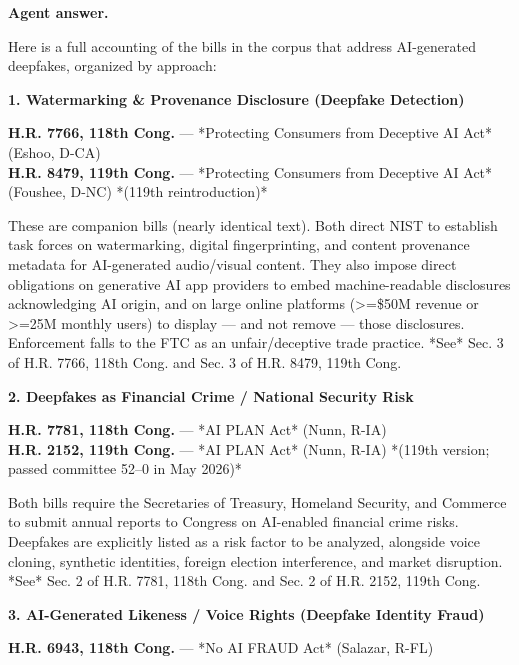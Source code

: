 \documentclass[11pt]{article}
\newcommand{\fieldlabel}[1]{\textbf{\color{navy}#1}\quad}
\begin{document}
\fieldlabel{Agent answer.}\par
Here is a full accounting of the bills in the corpus that address AI-generated deepfakes, organized by approach:

\textbf{1. Watermarking \& Provenance Disclosure (Deepfake Detection)}

\textbf{H.R. 7766, 118th Cong.} --- *Protecting Consumers from Deceptive AI Act* (Eshoo, D-CA) \\
\textbf{H.R. 8479, 119th Cong.} --- *Protecting Consumers from Deceptive AI Act* (Foushee, D-NC) *(119th reintroduction)*

These are companion bills (nearly identical text). Both direct NIST to establish task forces on watermarking, digital fingerprinting, and content provenance metadata for AI-generated audio/visual content. They also impose direct obligations on generative AI app providers to embed machine-readable disclosures acknowledging AI origin, and on large online platforms (\textgreater{}=\$50M revenue or \textgreater{}=25M monthly users) to display --- and not remove --- those disclosures. Enforcement falls to the FTC as an unfair/deceptive trade practice. *See* Sec. 3 of H.R. 7766, 118th Cong. and Sec. 3 of H.R. 8479, 119th Cong.

\textbf{2. Deepfakes as Financial Crime / National Security Risk}

\textbf{H.R. 7781, 118th Cong.} --- *AI PLAN Act* (Nunn, R-IA) \\
\textbf{H.R. 2152, 119th Cong.} --- *AI PLAN Act* (Nunn, R-IA) *(119th version; passed committee 52--0 in May 2026)*

Both bills require the Secretaries of Treasury, Homeland Security, and Commerce to submit annual reports to Congress on AI-enabled financial crime risks. Deepfakes are explicitly listed as a risk factor to be analyzed, alongside voice cloning, synthetic identities, foreign election interference, and market disruption. *See* Sec. 2 of H.R. 7781, 118th Cong. and Sec. 2 of H.R. 2152, 119th Cong.

\textbf{3. AI-Generated Likeness / Voice Rights (Deepfake Identity Fraud)}

\textbf{H.R. 6943, 118th Cong.} --- *No AI FRAUD Act* (Salazar, R-FL)
\end{document}
